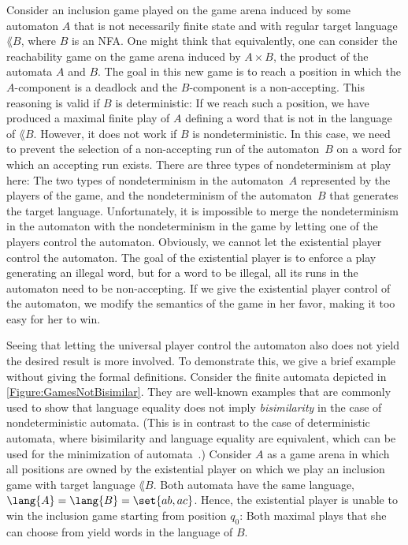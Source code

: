 \documentclass[../../diss.tex]{subfiles}
\begin{document}
Consider an inclusion game played on the game arena induced by some automaton $A$ that is not necessarily finite state and with regular target language $\lang{B}$, where $B$ is an NFA.\@
One might think that equivalently, one can consider the reachability game on the game arena induced by $A \times B$, the product of the automata $A$ and $B$.
The goal in this new game is to reach a position in which the $A$-component is a deadlock and the $B$-component is a non-accepting.
This reasoning is valid if $B$ is deterministic: If we reach such a position, we have produced a maximal finite play of $A$ defining a word that is not in the language of $\lang{B}$.
However, it does not work if $B$ is nondeterministic.
In this case, we need to prevent the selection of a non-accepting run of the automaton~$B$ on a word for which an accepting run exists.
There are three types of nondeterminism at play here: The two types of nondeterminism in the automaton~$A$ represented by the players of the game, and the nondeterminism of the automaton~$B$ that generates the target language.
Unfortunately, it is impossible to merge the nondeterminism in the automaton with the nondeterminism in the game by letting one of the players control the automaton.
%
Obviously, we cannot let the existential player control the automaton.
The goal of the existential player is to enforce a play generating an illegal word, but for a word to be illegal, all its runs in the automaton need to be non-accepting.
If we give the existential player control of the automaton, we modify the semantics of the game in her favor, making it too easy for her to win.

Seeing that letting the universal player control the automaton also does not yield the desired result is more involved.
To demonstrate this, we give a brief example without giving the formal definitions.
Consider the finite automata depicted in \cref{Figure:GamesNotBisimilar}.
They are well-known examples that are commonly used to show that language equality does not imply \emph{bisimilarity} in the case of nondeterministic automata.
(This is in contrast to the case of deterministic automata, where bisimilarity and language equality are equivalent, which can be used \eg for the minimization of automata~\cite{HopcroftK71}.)
Consider $A$ as a game arena in which all positions are owned by the existential player on which we play an inclusion game with target language $\lang{B}$.
Both automata have the same language, $\lang{A} = \lang{B} = \set{ab,ac}$.
Hence, the existential player is unable to win the inclusion game starting from position $q_0$: Both maximal plays that she can choose from yield words in the language of $B$.
\end{document}
